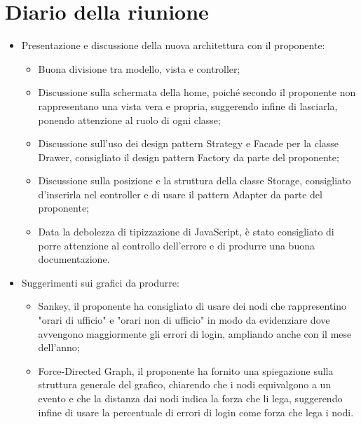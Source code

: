\section{Diario della riunione}
\begin{itemize}
  \item Presentazione e discussione della nuova architettura con il proponente:
    \begin{itemize}
      \item Buona divisione tra modello, vista e controller;
      \item Discussione sulla schermata della home, poiché secondo il proponente non rappresentano una vista vera e propria, suggerendo infine di lasciarla, ponendo attenzione al ruolo di ogni classe;
      \item Discussione sull'uso dei design pattern Strategy e Facade per la classe Drawer, consigliato il design pattern Factory da parte del proponente;
      \item Discussione sulla posizione e la struttura della classe Storage, consigliato d'inserirla nel controller e di usare il pattern Adapter da parte del proponente;
      \item Data la debolezza di tipizzazione di JavaScript, è stato consigliato di porre attenzione al controllo dell'errore e di produrre una buona documentazione.
    \end{itemize}
  \item Suggerimenti sui grafici da produrre:
    \begin{itemize}
      \item Sankey, il proponente ha consigliato di usare dei nodi che rappresentino "orari di ufficio" e "orari non di ufficio" in modo da evidenziare dove avvengono maggiormente gli errori di login, ampliando anche con il mese dell'anno;
      \item Force-Directed Graph, il proponente ha fornito una spiegazione sulla struttura generale del grafico, chiarendo che i nodi equivalgono a un evento e che la distanza dai nodi indica la forza che li lega, suggerendo infine di usare la percentuale di errori di login come forza che lega i nodi.
    \end{itemize} 
\end{itemize}